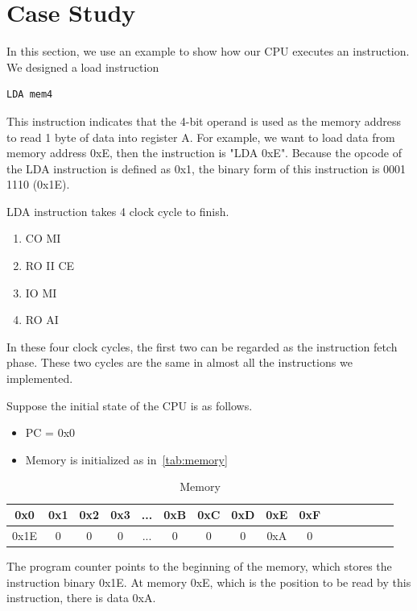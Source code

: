 \section{Case Study}
\label{sec:casestudy}
In this section, we use an example to show how our CPU executes an instruction.
We designed a load instruction
\begin{lstlisting}
LDA mem4
\end{lstlisting}
This instruction indicates that the 4-bit operand is used as the memory address to read 1 byte of data into register A. For example, we want to load data from memory address 0xE, then the instruction is "LDA 0xE". Because the opcode of the LDA instruction is defined as 0x1, the binary form of this instruction is 0001 1110 (0x1E).

LDA instruction takes 4 clock cycle to finish.

\begin{enumerate}
	\item CO MI
	\item RO II CE
	\item IO MI
	\item RO AI
\end{enumerate}

In these four clock cycles, the first two can be regarded as the instruction fetch phase. These two cycles are the same in almost all the instructions we implemented.

Suppose the initial state of the CPU is as follows.

\begin{itemize}
	\item PC = 0x0
	\item Memory is initialized as in~\autoref{tab:memory}
\end{itemize}

\begin{table}[th]
	\begin{tabular}{|c|c|c|c|c|c|c|c|c|c|c|c|c|c|c|c|} 
		\hline
		0x0 & 0x1 & 0x2 & 0x3 & ...  & 0xB & 0xC & 0xD & 0xE & 0xF \\ 
		\hline
		0x1E & 0 & 0 & 0 & ... & 0 & 0 & 0 & 0xA & 0 \\
		\hline
	\end{tabular}
	\caption{Memory}
	\label{tab:memory}
\end{table}

The program counter points to the beginning of the memory, which stores the instruction binary 0x1E. At memory 0xE, which is the position to be read by this instruction, there is data 0xA.

